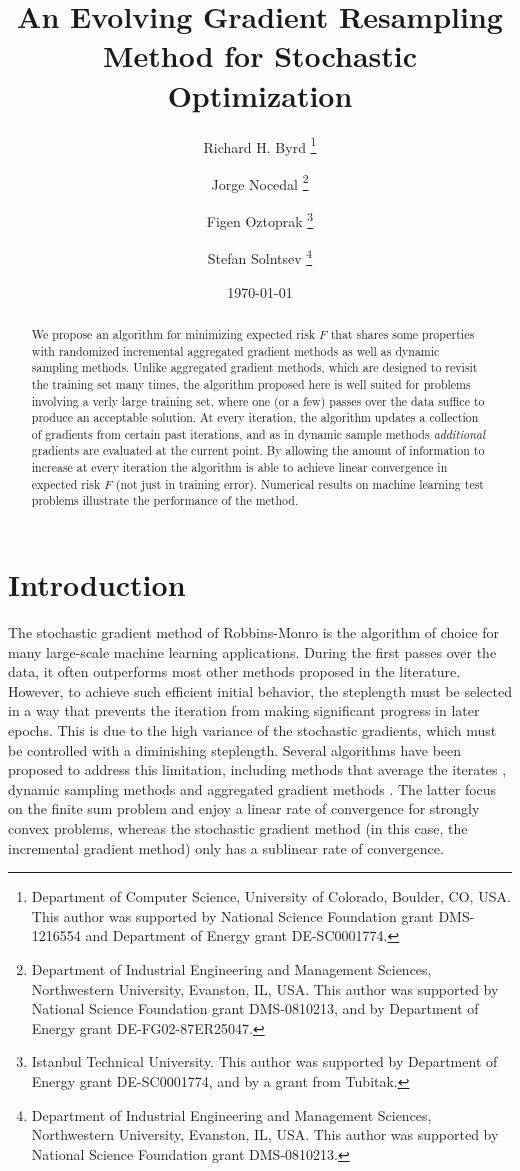 \documentclass[11pt]{article}
\title{An Evolving Gradient Resampling Method for Stochastic Optimization}
\author{Richard H. Byrd 
\thanks{Department of Computer Science, University of Colorado, Boulder, CO, USA. This author was supported by National Science Foundation grant DMS-1216554 and Department of Energy grant DE-SC0001774.} 
\and Jorge Nocedal 
\thanks{Department of Industrial Engineering and Management Sciences, Northwestern University, Evanston, IL, USA. This author was supported by National Science Foundation grant DMS-0810213, and by Department of Energy grant DE-FG02-87ER25047.} 
\and Figen Oztoprak 
\thanks{Istanbul Technical University. This author was supported by Department of Energy grant DE-SC0001774, and by a grant from Tubitak.} 
\and Stefan Solntsev \thanks{Department of Industrial Engineering and Management Sciences, Northwestern University, Evanston, IL, USA. This author was supported by National Science Foundation grant DMS-0810213.} 
}
\date{\today}
\begin{document}
\maketitle 
\begin{abstract}
We propose an algorithm for minimizing expected risk $F$ that shares some properties with randomized  incremental aggregated gradient methods as well as  dynamic sampling methods. Unlike aggregated gradient methods, which are designed to revisit the training set many times, the algorithm proposed here is well suited for problems involving a verly large training set,  where one (or a few) passes over the data suffice to produce an acceptable solution.  At every iteration, the algorithm updates  a collection of gradients  from certain past iterations, and as in dynamic sample methods \emph{additional} gradients are evaluated at the current point. By allowing the amount of information to increase at every iteration the algorithm is able to achieve  linear convergence in expected risk $F$ (not just in training error). Numerical results on machine learning test problems illustrate the performance of the method. 
\end{abstract}
\newpage 
\tableofcontents
\newpage

\section{Introduction}

The stochastic gradient method of Robbins-Monro \cite{RobMon51} is the algorithm of choice for many large-scale machine learning applications. During the first passes over the data, it often outperforms most other methods proposed in the literature. However, to achieve such efficient initial behavior, the steplength  must be selected in a way that prevents the iteration from making significant progress in later epochs. This is due to the high variance of the stochastic gradients, which must be controlled with a diminishing steplength. Several algorithms have been proposed to address this limitation, including methods that average the iterates \cite{PolJud92,ruppert1988efficient}, dynamic sampling methods \cite{dss,FS2011,2014pasglyetal} and aggregated gradient methods  \cite{roux2012stochastic,johnson2013accelerating,shalev2013stochastic,mairal2015incremental,defazio2014finito,frostig2014competing,NIPS2014_5258}. 
The latter focus on the finite sum problem and enjoy a linear rate of convergence for strongly convex problems, whereas the stochastic gradient method (in this case, the incremental gradient method) only has a sublinear rate of convergence. 
\end{document}
